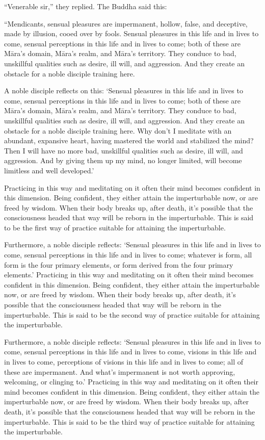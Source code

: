 \documentclass[12pt,openany]{book}%
\begin{document}
“Venerable sir,” they replied. The Buddha said this: 

“Mendicants, sensual pleasures are impermanent, hollow, false, and deceptive, made by illusion, cooed over by fools. Sensual pleasures in this life and in lives to come, sensual perceptions in this life and in lives to come; both of these are \textsanskrit{Māra}’s domain, \textsanskrit{Māra}’s realm, and \textsanskrit{Māra}’s territory. They conduce to bad, unskillful qualities such as desire, ill will, and aggression. And they create an obstacle for a noble disciple training here. 

A noble disciple reflects on this: ‘Sensual pleasures in this life and in lives to come, sensual perceptions in this life and in lives to come; both of these are \textsanskrit{Māra}’s domain, \textsanskrit{Māra}’s realm, and \textsanskrit{Māra}’s territory. They conduce to bad, unskillful qualities such as desire, ill will, and aggression. And they create an obstacle for a noble disciple training here. Why don’t I meditate with an abundant, expansive heart, having mastered the world and stabilized the mind? Then I will have no more bad, unskillful qualities such as desire, ill will, and aggression. And by giving them up my mind, no longer limited, will become limitless and well developed.’ 

Practicing in this way and meditating on it often their mind becomes confident in this dimension. Being confident, they either attain the imperturbable now, or are freed by wisdom. When their body breaks up, after death, it’s possible that the consciousness headed that way will be reborn in the imperturbable. This is said to be the first way of practice suitable for attaining the imperturbable. 

Furthermore, a noble disciple reflects: ‘Sensual pleasures in this life and in lives to come, sensual perceptions in this life and in lives to come; whatever is form, all form is the four primary elements, or form derived from the four primary elements.’ Practicing in this way and meditating on it often their mind becomes confident in this dimension. Being confident, they either attain the imperturbable now, or are freed by wisdom. When their body breaks up, after death, it’s possible that the consciousness headed that way will be reborn in the imperturbable. This is said to be the second way of practice suitable for attaining the imperturbable. 

Furthermore, a noble disciple reflects: ‘Sensual pleasures in this life and in lives to come, sensual perceptions in this life and in lives to come, visions in this life and in lives to come, perceptions of visions in this life and in lives to come; all of these are impermanent. And what’s impermanent is not worth approving, welcoming, or clinging to.’ Practicing in this way and meditating on it often their mind becomes confident in this dimension. Being confident, they either attain the imperturbable now, or are freed by wisdom. When their body breaks up, after death, it’s possible that the consciousness headed that way will be reborn in the imperturbable. This is said to be the third way of practice suitable for attaining the imperturbable. 
\end{document}

